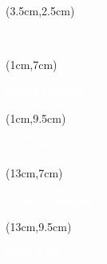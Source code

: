 \begin{titlepage}
    \thispagestyle{empty}

    

    \begin{textblock*}{14cm}(3.5cm,2.5cm)
        \begin{LARGE}
            \makeatletter
            \justifying

            \begin{center}
                \textbf{\textcolor{white}{\jobposition}}
                \\
                \textbf{\textcolor{white}{\thetitle}}
            \end{center}

            \makeatother
        \end{LARGE}
    \end{textblock*}

    \begin{textblock*}{10cm}(1cm,7cm)
        \begin{flushleft}
            \large
            \textbf{\textcolor{white}{NOM Prénom :}}
            \\
            \textbf{\textcolor{white}{\theauthor}}
        \end{flushleft}
    \end{textblock*}

    \begin{textblock*}{9cm}(1cm,9.5cm)
        \begin{flushleft}
            \large
            \textbf{\textcolor{white}{Conseiller UTT :}}
            \\
            \textbf{\textcolor{white}{\theRPeda}}
        \end{flushleft}
    \end{textblock*}


    \begin{textblock*}{7cm}(13cm,7cm)
        \begin{flushleft}
            \large
            \textbf{\textcolor{white}{Tronc Commun}}
        \end{flushleft}
    \end{textblock*}

    \begin{textblock*}{7cm}(13cm,9.5cm)
        \begin{flushleft}
            \large
            \textbf{\textcolor{white}{Semestre :}}
            \\
            \textcolor{white}{\theSemestre}
        \end{flushleft}
    \end{textblock*}


\end{titlepage}
